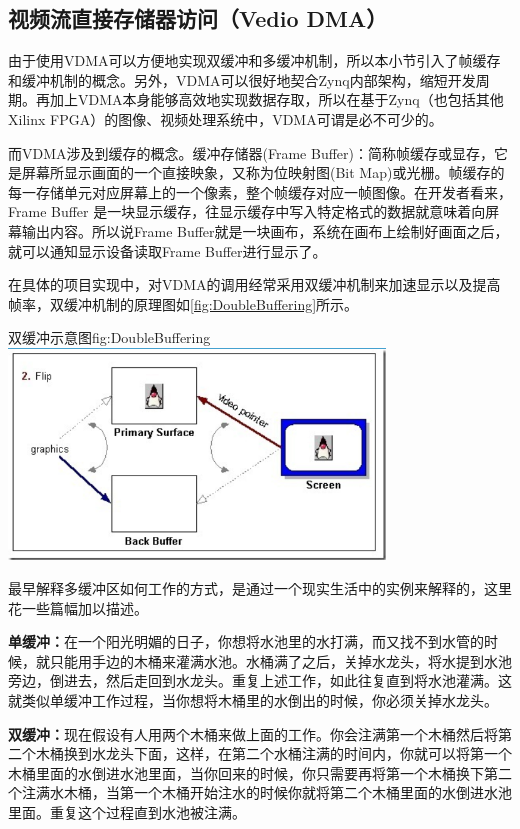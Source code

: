 \documentclass[supercite]{HustGraduPaper}
\begin{document}
	\subsection{视频流直接存储器访问（Vedio DMA）}
	由于使用VDMA可以方便地实现双缓冲和多缓冲机制，所以本小节引入了帧缓存和缓冲机制的概念。另外，VDMA可以很好地契合Zynq内部架构，缩短开发周期。再加上VDMA本身能够高效地实现数据存取，所以在基于Zynq（也包括其他Xilinx FPGA）的图像、视频处理系统中，VDMA可谓是必不可少的。
	
	而VDMA涉及到缓存的概念。缓冲存储器(Frame Buffer)：简称帧缓存或显存，它是屏幕所显示画面的一个直接映象，又称为位映射图(Bit Map)或光栅。帧缓存的每一存储单元对应屏幕上的一个像素，整个帧缓存对应一帧图像。在开发者看来，Frame Buffer 是一块显示缓存，往显示缓存中写入特定格式的数据就意味着向屏幕输出内容。所以说Frame Buffer就是一块画布，系统在画布上绘制好画面之后，就可以通知显示设备读取Frame Buffer进行显示了。
	
	在具体的项目实现中，对VDMA的调用经常采用双缓冲机制来加速显示以及提高帧率，双缓冲机制的原理图如\autoref{fig:DoubleBuffering}所示。
	
	\begin{generalfig}[htb]{双缓冲示意图}{fig:DoubleBuffering}
		\includegraphics[width=10cm]{Figures/DoubleBuffering.png}
	\end{generalfig}
	
	
	最早解释多缓冲区如何工作的方式，是通过一个现实生活中的实例来解释的，这里花一些篇幅加以描述。
	
	{\songti \bfseries 单缓冲：}在一个阳光明媚的日子，你想将水池里的水打满，而又找不到水管的时候，就只能用手边的木桶来灌满水池。水桶满了之后，关掉水龙头，将水提到水池旁边，倒进去，然后走回到水龙头。重复上述工作，如此往复直到将水池灌满。这就类似单缓冲工作过程，当你想将木桶里的水倒出的时候，你必须关掉水龙头。
	
	{\songti \bfseries 双缓冲：}现在假设有人用两个木桶来做上面的工作。你会注满第一个木桶然后将第二个木桶换到水龙头下面，这样，在第二个水桶注满的时间内，你就可以将第一个木桶里面的水倒进水池里面，当你回来的时候，你只需要再将第一个木桶换下第二个注满水木桶，当第一个木桶开始注水的时候你就将第二个木桶里面的水倒进水池里面。重复这个过程直到水池被注满。
	
\end{document}
